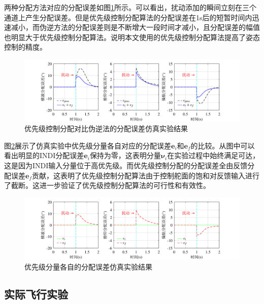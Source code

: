 两种分配方法对应的分配误差如图\ref{优先级伪逆分配误差仿真}所示。可以看出，扰动添加的瞬间立刻在三个通道上产生分配误差。但是优先级控制分配算法的分配误差在1s后的短暂时间内迅速减小，而伪逆方法的分配误差则是不断增大一段时间才减小，且分配误差的幅值也明显大于优先级控制分配算法。说明本文使用的优先级控制分配算法提高了姿态控制的精度。
\begin{figure}[htbp]
	\centering
	\begin{minipage}[c]{1\textwidth}
        \centering
        \includegraphics[scale=1]{Fig/优先级对比伪逆的分配误差仿真实验结果.pdf}
        \caption{\label{优先级伪逆分配误差仿真}优先级控制分配对比伪逆法的分配误差仿真实验结果}
        \end{minipage}
\end{figure}

图\ref{优先级分量分配误差仿真}展示了仿真实验中优先级分量各自对应的分配误差$\boldsymbol{e}_i$和$\boldsymbol{e}_f$的比较。从图中可以看出明显的INDI分配误差$\boldsymbol{e}_i$保持为零，这表明分量$\boldsymbol{\nu}_i$在实验过程中始终满足可达，这是因为INDI输入分量位于高优先级。而优先级控制分配的分配误差全由反馈分配误差$\boldsymbol{e}_f$贡献，这表明了优先级控制分配算法由于控制舵面的饱和对反馈输入进行了截断。这进一步验证了优先级控制分配算法的可行性和有效性。
\begin{figure}[htbp]
	\centering
	\begin{minipage}[c]{1\textwidth}
        \centering
        \includegraphics[scale=1]{Fig/优先级各分量的分配误差仿真实验结果.pdf}
        \caption{\label{优先级分量分配误差仿真}优先级分量各自的分配误差仿真实验结果}
        \end{minipage}
\end{figure}
\subsection{实际飞行实验}

